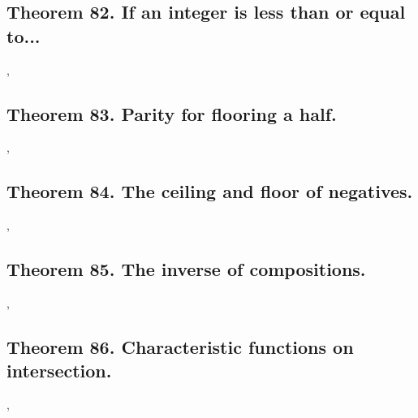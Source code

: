 \documentclass[preview]{standalone}
\begin{document}
\subsection[If an integer is less than or equal to...]
    {
        \color{section}Theorem 82. \color{black} If an integer is less than or equal to...
    }

\sep
\pagebreak


\subsection[Parity for flooring a half.]
    {
        \color{section}Theorem 83. \color{black} Parity for flooring a half.
    }

\sep
\pagebreak


\subsection[The ceiling and floor of negative numbers.]
    {
        \color{section}Theorem 84. \color{black} The ceiling and floor of negatives.
    }

\sep
\pagebreak


\subsection[The inverse of compositions.]
    {
        \color{section}Theorem 85. \color{black} The inverse of compositions.
    }

\sep
\pagebreak


\subsection[Characteristic functions on intersections.]
    {
        \color{section}Theorem 86. \color{black} Characteristic functions on intersection.
    }

\sep
\pagebreak


\end{document}
